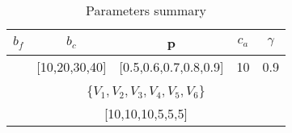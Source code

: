 \begin{table}[]
\begin{tabular}{|c|c|l|c|c|c|}
\hline
$b_f$   & \multicolumn{2}{c|}{$b_c$}         & p                     & $c_a$ & $\gamma$ \\ \hline
[30,40] & \multicolumn{2}{c|}{[10,20,30,40]} & [0.5,0.6,0.7,0.8,0.9] & 10    & 0.9      \\ \hline
\multicolumn{6}{|c|}{\{$V_1,V_2,V_3,V_4,V_5,V_6$\}}                                     \\ \hline
\multicolumn{6}{|c|}{[10,10,10,5,5,5]}                                                  \\ \hline
\end{tabular}
\caption{Parameters summary}
\label{tab:parameters}
\end{table}